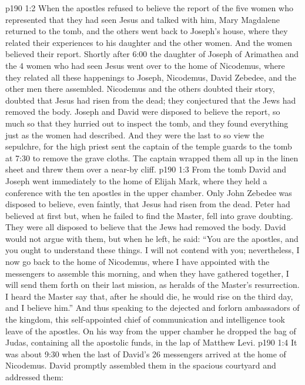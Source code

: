 \vs p190 1:2 When the apostles refused to believe the report of the five women who represented that they had seen Jesus and talked with him, Mary Magdalene returned to the tomb, and the others went back to Joseph’s house, where they related their experiences to his daughter and the other women. And the women believed their report. Shortly after 6:00 the daughter of Joseph of Arimathea and the 4 women who had seen Jesus went over to the home of Nicodemus, where they related all these happenings to Joseph, Nicodemus, David Zebedee, and the other men there assembled. Nicodemus and the others doubted their story, doubted that Jesus had risen from the dead; they conjectured that the Jews had removed the body. Joseph and David were disposed to believe the report, so much so that they hurried out to inspect the tomb, and they found everything just as the women had described. And they were the last to so view the sepulchre, for the high priest sent the captain of the temple guards to the tomb at 7:30 to remove the grave cloths. The captain wrapped them all up in the linen sheet and threw them over a near\hyp{}by cliff.
\vs p190 1:3 From the tomb David and Joseph went immediately to the home of Elijah Mark, where they held a conference with the ten apostles in the upper chamber. Only John Zebedee was disposed to believe, even faintly, that Jesus had risen from the dead. Peter had believed at first but, when he failed to find the Master, fell into grave doubting. They were all disposed to believe that the Jews had removed the body. David would not argue with them, but when he left, he said: “You are the apostles, and you ought to understand these things. I will not contend with you; nevertheless, I now go back to the home of Nicodemus, where I have appointed with the messengers to assemble this morning, and when they have gathered together, I will send them forth on their last mission, as heralds of the Master’s resurrection. I heard the Master say that, after he should die, he would rise on the third day, and I believe him.” And thus speaking to the dejected and forlorn ambassadors of the kingdom, this self\hyp{}appointed chief of communication and intelligence took leave of the apostles. On his way from the upper chamber he dropped the bag of Judas, containing all the apostolic funds, in the lap of Matthew Levi.
\vs p190 1:4 It was about 9:30 when the last of David’s 26 messengers arrived at the home of Nicodemus. David promptly assembled them in the spacious courtyard and addressed them:
